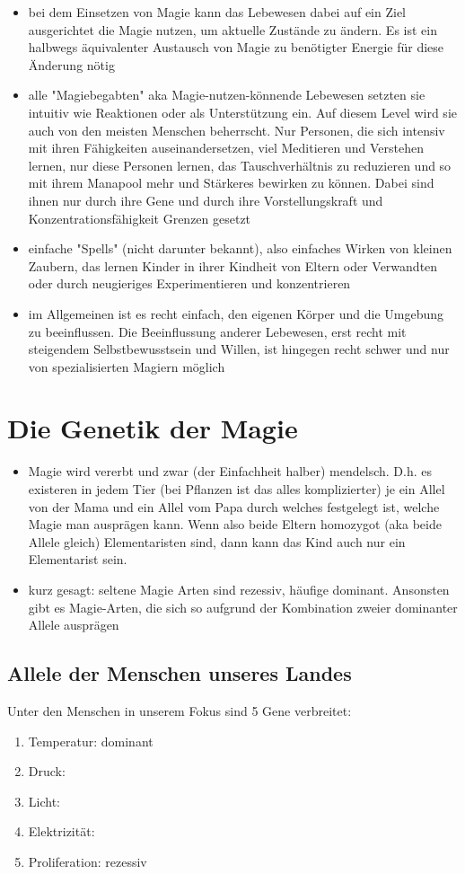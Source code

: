 \begin{itemize}
	\item bei dem Einsetzen von Magie kann das Lebewesen dabei auf ein Ziel ausgerichtet die Magie nutzen, um aktuelle Zustände zu ändern. Es ist ein halbwegs äquivalenter Austausch von Magie zu benötigter Energie für diese Änderung nötig
	\item alle "Magiebegabten" aka Magie-nutzen-könnende Lebewesen setzten sie intuitiv wie Reaktionen oder als Unterstützung ein. Auf diesem Level wird sie auch von den meisten Menschen beherrscht. Nur Personen, die sich intensiv mit ihren Fähigkeiten auseinandersetzen, viel Meditieren und Verstehen lernen, nur diese Personen lernen, das Tauschverhältnis zu reduzieren und so mit ihrem Manapool mehr und Stärkeres bewirken zu können. Dabei sind ihnen nur durch ihre Gene und durch ihre Vorstellungskraft und Konzentrationsfähigkeit Grenzen gesetzt
	\item einfache "Spells" (nicht darunter bekannt), also einfaches Wirken  von kleinen Zaubern, das lernen Kinder in ihrer Kindheit von Eltern oder Verwandten oder durch neugieriges Experimentieren und konzentrieren
	\item im Allgemeinen ist es recht einfach, den eigenen Körper und die Umgebung zu beeinflussen. Die Beeinflussung anderer Lebewesen, erst recht mit steigendem Selbstbewusstsein und Willen, ist hingegen recht schwer und nur von spezialisierten Magiern möglich
\end{itemize}


\section{Die Genetik der Magie}
\begin{itemize}
	\item Magie wird vererbt und zwar (der Einfachheit halber) mendelsch. D.h. es existeren in jedem Tier (bei Pflanzen ist das alles komplizierter) je ein Allel von der Mama und ein Allel vom Papa durch welches festgelegt ist, welche Magie man ausprägen kann. Wenn also beide Eltern homozygot (aka beide Allele gleich) Elementaristen sind, dann kann das Kind auch nur ein Elementarist sein.
	\item kurz gesagt: seltene Magie Arten sind rezessiv, häufige dominant. Ansonsten gibt es Magie-Arten, die sich so aufgrund der Kombination zweier dominanter Allele ausprägen
\end{itemize}
\subsection{Allele der Menschen unseres Landes}
Unter den Menschen in unserem Fokus sind 5 Gene verbreitet: 
\begin{enumerate}
	\item Temperatur: dominant
	\item Druck: 
	\item Licht: 
	\item Elektrizität: 
	\item Proliferation: rezessiv 
\end{enumerate}

